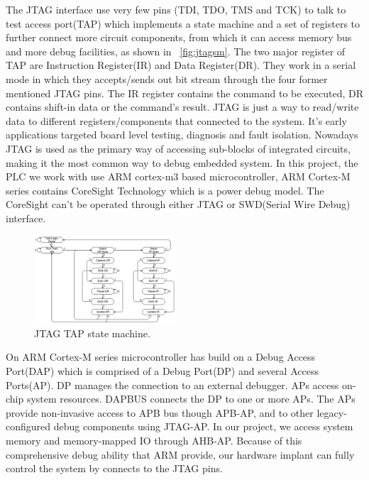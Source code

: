 The JTAG interface use very few pins (TDI, TDO, TMS and TCK) to talk to test access port(TAP) which implements a state machine and a set of registers to further connect more circuit components, from which it can access memory bus and more debug facilities, as shown in ~\autoref{fig:jtagsm}. The two major register of TAP are Instruction Register(IR) and Data Register(DR). They work in a serial mode in which they accepts/sends out bit stream through the four former mentioned JTAG pins. The IR register contains the command to be executed, DR contains shift-in data or the command's result. JTAG is just a way to read/write data to different registers/components that connected to the system. It's early applications targeted board level testing, diagnosis and fault isolation. Nowadays JTAG is used as the primary way of accessing sub-blocks of integrated circuits, making it the most common way to debug embedded system. In this project, the PLC we work with use ARM cortex-m3 based microcontroller, ARM Cortex-M series  contains CoreSight Technology which is a power debug model. The CoreSight can't be operated through either JTAG or SWD(Serial Wire Debug) interface.

\begin{figure}[th]
	\includegraphics[width=0.47\textwidth]{figures/jtagsm}
	\centering
	\caption{JTAG TAP state machine.}
	\label{fig:jtagsm}
\end{figure}


On ARM Cortex-M series microcontroller has build on a Debug Access Port(DAP) which is comprised of a Debug Port(DP) and several Access Ports(AP). DP manages the connection to an external debugger. APs access on-chip system resources. DAPBUS connects the DP to one or more APs. The APs provide non-invasive access to APB bus though APB-AP,  and to other legacy-configured debug components using JTAG-AP. In our project, we access system memory and memory-mapped IO through AHB-AP. Because of this comprehensive debug ability that ARM provide, our hardware implant can fully control the system by connects to the JTAG pins.

